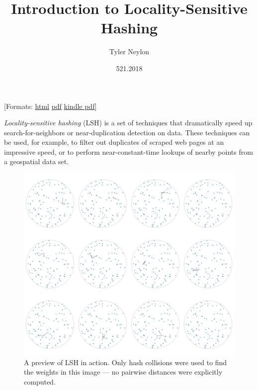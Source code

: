 \documentclass[20pt,]{extarticle}
\title{Introduction to Locality-Sensitive Hashing}
\author{Tyler Neylon}
\date{521.2018}
\newcommand{\class}[1]{}
\newcommand{\optquad}{\quad}
\newcommand{\smallscrneg}{}
\newcommand{\smallscr}[1]{}
\newcommand{\bigscr}[1]{#1}
\newcommand{\smallscrskip}[1]{}
\begin{document}
\maketitle

\newcommand{\R}{\mathbb{R}}
\newcommand{\Z}{\mathbb{Z}}
\newcommand{\eqnset}[1]{\left.\mbox{$#1$}\;\;\right\rbrace\class{postbrace}{ }}
\providecommand{\optquad}{\class{optquad}{}}
\providecommand{\smallscrneg}{\class{smallscrneg}{ }}
\providecommand{\bigscr}[1]{\class{bigscr}{#1}}
\providecommand{\smallscr}[1]{\class{smallscr}{#1}}
\providecommand{\smallscrskip}[1]{\class{smallscr}{\hskip #1}}

\providecommand{\flexquad}{\quad\smallscrskip{-0.8em}}
\providecommand{\flexspace}{\;\;\smallscrskip{-0.3em}}

{[}Formats: \href{http://tylerneylon.com/a/lsh1/lsh_post1.html}{html}
\textbar{} \href{http://tylerneylon.com/a/lsh1/lsh_post1.pdf}{pdf}
\textbar{}
\href{http://tylerneylon.com/a/lsh1/lsh_post1_for_kindle.pdf}{kindle
pdf}{]}

\emph{Locality-sensitive hashing} (LSH) is a set of techniques that
dramatically speed up search-for-neighbors or near-duplication detection
on data. These techniques can be used, for example, to filter out
duplicates of scraped web pages at an impressive speed, or to perform
near-constant-time lookups of nearby points from a geospatial data set.

\begin{figure}
\centering
\includegraphics{images/image8b_fixed.png}
\caption{A preview of LSH in action. Only hash collisions were used to
find the weights in this image --- no pairwise distances were explicitly
computed.}\label{fig:fig0}
\end{figure}
\end{document}
